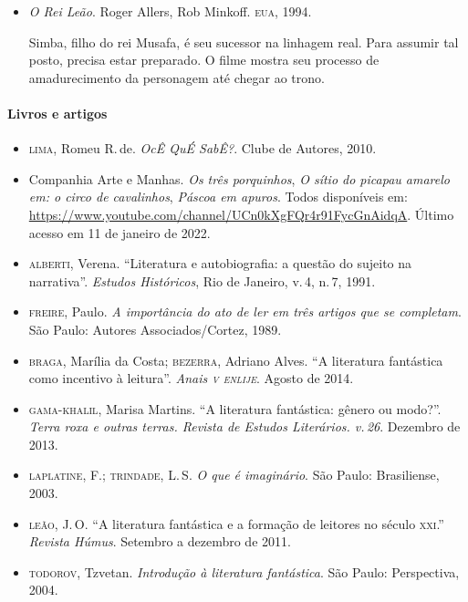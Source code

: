 \documentclass[11pt]{extarticle}
\begin{document}
\begin{itemize}
\item \textit{O Rei Leão}. Roger Allers, Rob Minkoff. \textsc{eua}, 1994.

Simba, filho do rei Musafa, é seu sucessor na linhagem real. Para assumir tal posto,
precisa estar preparado. O filme mostra seu processo de amadurecimento da personagem
até chegar ao trono.

\end{itemize}


\paragraph{Livros e artigos}

\begin{itemize}
	
	\item \textsc{lima}, Romeu R.\,de. \textit{OcÊ QuÉ SabÊ?}. Clube de Autores, 2010. 

\item Companhia Arte e Manhas. \textit{Os três porquinhos}, \textit{O sítio do picapau amarelo em: o circo de cavalinhos},
\textit{Páscoa em apuros}. Todos disponíveis em: \url{https://www.youtube.com/channel/UCn0kXgFQr4r91FycGnAidqA}. Último acesso em 11 de janeiro de 2022.

\item \textsc{alberti}, Verena. ``Literatura e autobiografia: a questão do sujeito na narrativa''. \textit{Estudos Históricos}, Rio de Janeiro, v.\,4, n.\,7, 1991.

\item \textsc{freire}, Paulo. \textit{A importância do ato de ler em três artigos que se completam}. São Paulo: Autores Associados/Cortez, 1989.

\item \textsc{braga}, Marília da Costa; \textsc{bezerra}, Adriano Alves. ``A literatura fantástica como incentivo à leitura''. \textit{Anais \textsc{v enlije}}. Agosto de 2014.

\item \textsc{gama-khalil}, Marisa Martins. ``A literatura fantástica: gênero ou modo?''. \textit{Terra roxa e outras terras. Revista de Estudos Literários. v.\,26}. Dezembro de 2013. 

\item \textsc{laplatine}, F.; \textsc{trindade}, L.\,S. \textit{O que é imaginário}. São Paulo: Brasiliense, 2003. 

\item \textsc{leão}, J.\,O. ``A literatura fantástica e a formação de leitores no século \textsc{xxi}.'' \textit{Revista Húmus}. Setembro a dezembro de 2011. 

\item \textsc{todorov}, Tzvetan. \textit{Introdução à literatura fantástica}. São Paulo: Perspectiva, 2004.

\end{itemize}
\end{document}
